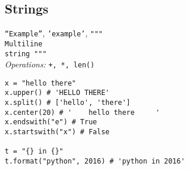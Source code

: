 \subsection{Strings}
\texttt{``Example''}, \texttt{'example'}, \texttt{""" \\
Multiline \\
string """}\\
\textit{Operations:} \texttt{+, *, len()}
\begin{lstlisting}
x = "hello there"
x.upper() # 'HELLO THERE'
x.split() # ['hello', 'there']
x.center(20) # '    hello there     '
x.endswith("e") # True
x.startswith("x") # False

t = "{} in {}"
t.format("python", 2016) # 'python in 2016'
\end{lstlisting}
